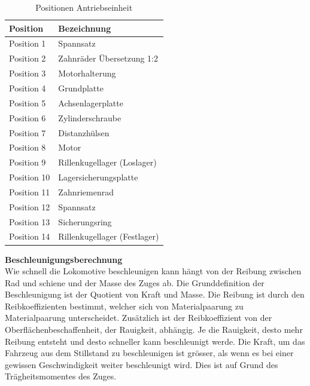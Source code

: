 \documentclass[../../main.tex]{subfiles}
\begin{document}
    \begin{table}[H] \centering
        \begin{tabular}{|l|l|}
        \hline
        \textbf{Position} & \textbf{Bezeichnung}\\
        \hline
        Position 1          & Spannsatz\\
         \hline
        Position 2          & Zahnräder Übersetzung 1:2\\
        \hline
        Position 3          & Motorhalterung\\
        \hline
        Position 4          & Grundplatte\\
        \hline
        Position 5          & Achsenlagerplatte\\
        \hline
        Position 6          & Zylinderschraube\\
        \hline
        Position 7          & Distanzhülsen\\
        \hline
        Position 8          & Motor\\
        \hline
        Position 9          & Rillenkugellager (Loslager)\\
        \hline
        Position 10         & Lagersicherungsplatte\\
        \hline
        Position 11         & Zahnriemenrad\\
        \hline
        Position 12         & Spannsatz\\
        \hline
        Position 13         & Sicherungsring\\
        \hline
        Position 14         & Rillenkugellager (Festlager)\\
        \hline
        \end{tabular}

        \caption{Positionen Antriebseinheit}
        \label{tab:pos_antriebseinheit}
        \end{table}

    \newpage

    \textbf{Beschleunigungsberechnung}\\
    Wie schnell die Lokomotive beschleunigen kann hängt von der Reibung zwischen Rad und schiene und der Masse des Zuges ab. Die Grunddefinition der Beschleunigung ist der Quotient von Kraft und Masse. Die Reibung ist durch den Reibkoeffizienten bestimmt, welcher sich von Materialpaarung zu Materialpaarung unterscheidet. Zusätzlich ist der Reibkoeffizient von der Oberflächenbeschaffenheit, der Rauigkeit, abhängig. Je die Rauigkeit, desto mehr Reibung entsteht und desto schneller kann beschleunigt werde. Die Kraft, um das Fahrzeug aus dem Stillstand zu beschleunigen ist grösser, als wenn es bei einer gewissen Geschwindigkeit weiter beschleunigt wird. Dies ist auf Grund des Trägheitsmomentes des Zuges. \\
\end{document}
